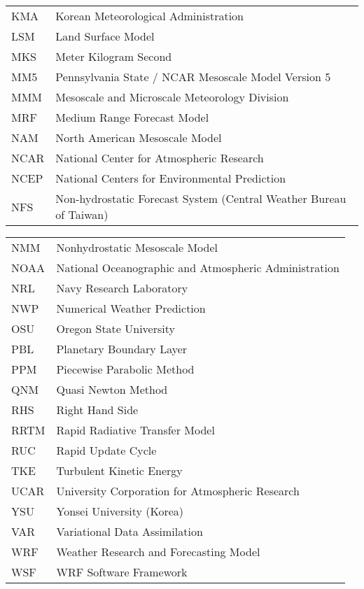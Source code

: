 \begin{tabular}[t]{ll}
KMA & Korean Meteorological Administration \\
LSM & Land Surface Model \\
MKS & Meter Kilogram Second \\
MM5 & Pennsylvania State / NCAR Mesoscale Model Version 5 \\
MMM & Mesoscale and Microscale Meteorology Division \\
MRF & Medium Range Forecast Model \\
NAM & North American Mesoscale Model \\
NCAR & National Center for Atmospheric Research \\
NCEP & National Centers for Environmental Prediction \\
NFS & Non-hydrostatic Forecast System (Central Weather Bureau of Taiwan) \\
\end{tabular}
\newpage
\normalsize
\begin{tabular}[t]{ll}
NMM & Nonhydrostatic Mesoscale Model \\
NOAA & National Oceanographic and Atmospheric Administration \\
NRL & Navy Research Laboratory \\
NWP & Numerical Weather Prediction \\
OSU & Oregon State University \\
PBL & Planetary Boundary Layer \\
PPM & Piecewise Parabolic Method \\
QNM & Quasi Newton Method \\
RHS & Right Hand Side \\
RRTM & Rapid Radiative Transfer Model \\
RUC & Rapid Update Cycle \\
TKE & Turbulent Kinetic Energy \\
UCAR & University Corporation for Atmospheric Research \\
YSU & Yonsei University (Korea) \\
VAR & Variational Data Assimilation \\
WRF & Weather Research and Forecasting Model \\
WSF & WRF Software Framework \\
\end{tabular}
